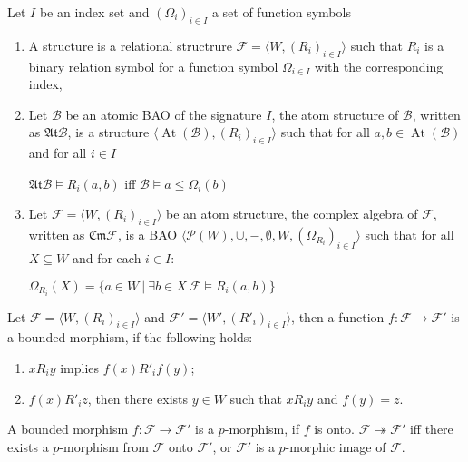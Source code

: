 \documentclass[a4paper]{article}
\theoremstyle{defin}
\theoremstyle{theorem}
\theoremstyle{claim}
\theoremstyle{prop}
\theoremstyle{lemma}
\theoremstyle{fact}
\theoremstyle{ex}
\theoremstyle{col}
\begin{document}
\begin{defin}  Let $I$ be an index set and $(\Omega_i)_{i \in I}$ a set of function symbols
\begin{enumerate}
  \item A structure is a relational structrure
  $\mathcal{F} = \langle W, (R_{i})_{i \in I} \rangle$
  such that $R_{i}$ is a binary relation symbol for a function symbol $\Omega_{i \in I}$ with the corresponding index,
  \item Let $\mathcal{B}$ be an atomic BAO of the signature $I$,
the atom structure of $\mathcal{B}$, written as $\mathfrak{At} \mathcal{B}$, is a structure $\langle \operatorname{At}(\mathcal{B}), (R_{i})_{i \in I} \rangle$ such that for all
$a, b \in \operatorname{At}(\mathcal{B})$ and for all $i \in I$
\begin{center}
  $\mathfrak{At} \mathcal{B} \models R_{i}(a,b)$ iff $\mathcal{B} \models a \leq \Omega_{i}(b)$
\end{center}
\item Let $\mathcal{F} = \langle W, (R_{i})_{i \in I} \rangle$ be an atom structure, the complex algebra of $\mathcal{F}$, written as $\mathfrak{Cm} \mathcal{F}$, is a BAO
$\langle \mathcal{P}(W), \cup, -, \emptyset, W, (\Omega_{R_{i}})_{i \in I} \rangle$ such that
for all $X \subseteq W$ and for each $i \in I$:
\begin{center}
  $\Omega_{R_{i}}(X) = \{ a \in W \: | \: \exists b \in X \: \mathcal{F} \models R_{i}(a, b)\}$
\end{center}
\end{enumerate}
\end{defin}

\begin{defin} Let $\mathcal{F} = \langle W, (R_{i})_{i \in I} \rangle$ and $\mathcal{F}' = \langle W', ({R'}_{i})_{i \in I} \rangle$, then a function $f : \mathcal{F} \to \mathcal{F}'$ is a bounded morphism, if the following holds:
\begin{enumerate}
\item $x R_i y$ implies $f(x) {R'}_i f(y)$;
\item $f(x) {R'}_i z$, then there exists $y \in W$ such that $x R_i y$ and $f(y) = z$.
\end{enumerate}
A bounded morphism $f : \mathcal{F} \to \mathcal{F}'$ is a $p$-morphism, if $f$ is onto. $\mathcal{F} \twoheadrightarrow \mathcal{F}'$ iff there exists a $p$-morphism from $\mathcal{F}$ onto $\mathcal{F}'$, or $\mathcal{F}'$ is a $p$-morphic image of $\mathcal{F}$.
\end{defin}
\end{document}
